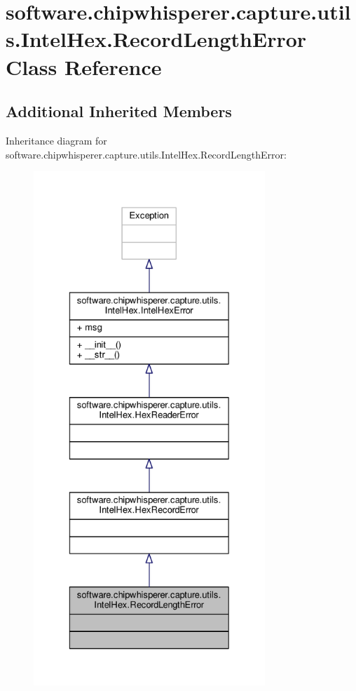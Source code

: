 \hypertarget{classsoftware_1_1chipwhisperer_1_1capture_1_1utils_1_1IntelHex_1_1RecordLengthError}{}\section{software.\+chipwhisperer.\+capture.\+utils.\+Intel\+Hex.\+Record\+Length\+Error Class Reference}
\label{classsoftware_1_1chipwhisperer_1_1capture_1_1utils_1_1IntelHex_1_1RecordLengthError}
\subsection*{Additional Inherited Members}


Inheritance diagram for software.\+chipwhisperer.\+capture.\+utils.\+Intel\+Hex.\+Record\+Length\+Error\+:\nopagebreak
\begin{figure}[H]
\begin{center}
\leavevmode
\includegraphics[height=550pt]{d9/d13/classsoftware_1_1chipwhisperer_1_1capture_1_1utils_1_1IntelHex_1_1RecordLengthError__inherit__graph}
\end{center}
\end{figure}


